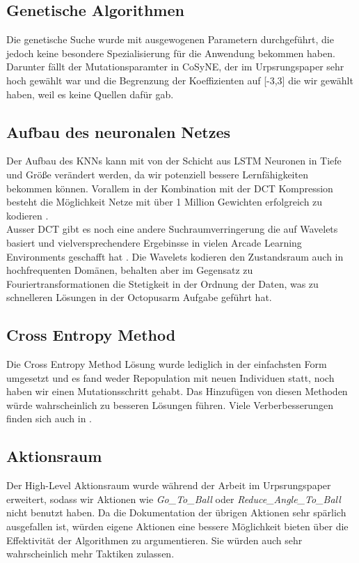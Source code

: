         \subsection*{Genetische Algorithmen}
            Die genetische Suche wurde mit ausgewogenen Parametern durchgeführt, die jedoch keine besondere Spezialisierung für die Anwendung bekommen haben. Darunter fällt der Mutationsparamter in CoSyNE, der im Urpsrungspaper sehr hoch gewählt war \cite{cosyne2} und die Begrenzung der Koeffizienten auf [-3,3] die wir gewählt haben, weil es keine Quellen dafür gab. 
        \subsection*{Aufbau des neuronalen Netzes}
            Der Aufbau des KNNs kann mit von der Schicht aus LSTM Neuronen in Tiefe und Größe verändert werden, da wir potenziell bessere Lernfähigkeiten bekommen können. Vorallem in der Kombination mit der DCT Kompression besteht die Möglichkeit Netze mit über 1 Million Gewichten erfolgreich zu kodieren \cite{cosyne4}. \\[2mm]
            \noindent
            Ausser DCT gibt es noch eine andere Suchraumverringerung die auf Wavelets basiert und vielversprechendere Ergebinsse in vielen Arcade Learning Environments geschafft hat \cite{wavelet}. Die Wavelets kodieren den Zustandsraum auch in hochfrequenten Domänen, behalten aber im Gegensatz zu Fouriertransformationen die Stetigkeit in der Ordnung der Daten, was zu schnelleren Lösungen in der Octopusarm Aufgabe geführt hat.

        \subsection*{Cross Entropy Method}
            Die Cross Entropy Method Lösung wurde lediglich in der einfachsten Form umgesetzt und es fand weder Repopulation mit neuen Individuen statt, noch haben wir einen Mutationsschritt gehabt. Das Hinzufügen von diesen Methoden würde wahrscheinlich zu besseren Lösungen führen. Viele Verberbesserungen finden sich auch in \cite{cem}.

        \subsection*{Aktionsraum}
            Der High-Level Aktionsraum wurde während der Arbeit im Urpsrungspaper erweitert, sodass wir Aktionen wie \textit{Go\_To\_Ball} oder \textit{Reduce\_Angle\_To\_Ball} nicht benutzt haben. Da die Dokumentation der übrigen Aktionen sehr spärlich ausgefallen ist, würden eigene Aktionen eine bessere Möglichkeit bieten über die Effektivität der Algorithmen zu argumentieren. Sie würden auch sehr wahrscheinlich mehr Taktiken zulassen.

